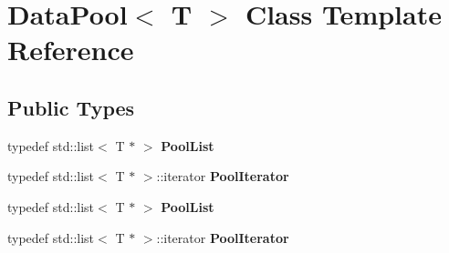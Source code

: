 \hypertarget{classDataPool}{}\section{Data\+Pool$<$ T $>$ Class Template Reference}
\label{classDataPool}
\subsection*{Public Types}
\begin{DoxyCompactItemize}
\item 
\mbox{\label{classDataPool_aa514608315c193f3d17b6a3bc61d0361}} 
typedef std\+::list$<$ T $\ast$ $>$ {\bfseries Pool\+List}
\item 
\mbox{\label{classDataPool_a4d0db670501107c912f8ac74a18b1ac9}} 
typedef std\+::list$<$ T $\ast$ $>$\+::iterator {\bfseries Pool\+Iterator}
\item 
\mbox{\label{classDataPool_aa514608315c193f3d17b6a3bc61d0361}} 
typedef std\+::list$<$ T $\ast$ $>$ {\bfseries Pool\+List}
\item 
\mbox{\label{classDataPool_a4d0db670501107c912f8ac74a18b1ac9}} 
typedef std\+::list$<$ T $\ast$ $>$\+::iterator {\bfseries Pool\+Iterator}
\end{DoxyCompactItemize}
